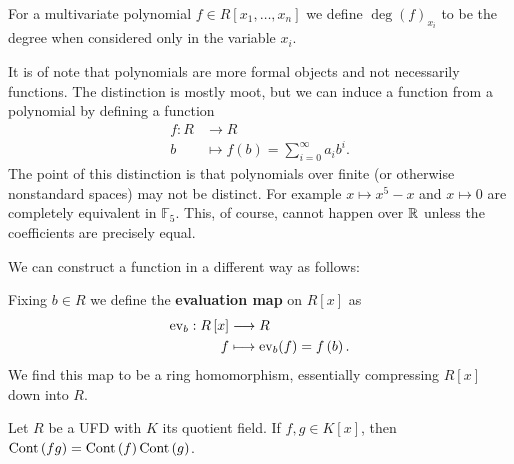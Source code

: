 \begin{definition}
	For a multivariate polynomial \(f \in R\left[ x_1, \ldots, x_{n} \right] \) we define \(\deg \left(  f \right) _{x_{i}}\) to be the degree when considered only in the variable \(x_{i}\).
\end{definition}
\begin{remark}
	It is of note that polynomials are more formal objects and not necessarily functions. The distinction is mostly moot, but we can induce a function from a polynomial by defining a function \begin{align*}
		f: R &\longrightarrow R \\
		b &\longmapsto f(b) = \sum_{i=0}^{\infty} a_{i}b^{i}
	.\end{align*}
	The point of this distinction is that polynomials over finite (or otherwise nonstandard spaces) may not be distinct. For example \(x \mapsto x^{5} - x\) and \(x \mapsto 0\) are completely equivalent in \(\mathbb{F}_5\). This, of course, cannot happen over \(\mathbb{R}\) unless the coefficients are precisely equal.
\end{remark}
We can construct a function in a different way as follows:
\begin{definition}
	Fixing \(b \in R\) we define the \textbf{evaluation map} on \(R\left[ x \right] \)  as \begin{align*}
		\operatorname{ev}_{b}: R\left[ x \right]   &\longrightarrow  R\\
		f &\longmapsto \operatorname{ev}_{b}(f) = f\left( b \right)
	.\end{align*}
	We find this map to be a ring homomorphism, essentially compressing \(R\left[ x \right] \) down into \(R\).
\end{definition}
\begin{lemma}
	Let \(R\) be a UFD with \(K\) its quotient field. If \(f, g \in K\left[ x \right] \), then \(\operatorname{Cont}\left( fg \right) = \operatorname{Cont}\left( f \right) \operatorname{Cont}\left( g \right) \).
\end{lemma}
